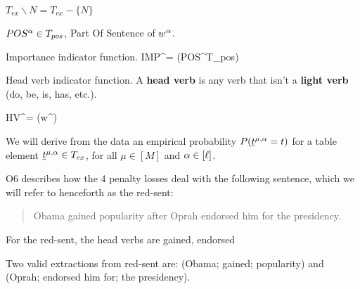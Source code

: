 $T_{ex}\backslash N = T_{ex}-\{N\}$


$POS^\alpha\in T_{pos}$, Part Of Sentence of $w^\alpha$.



Importance indicator function.
\beq
IMP^\alp = \indi(POS^\alp \in T_{pos})
\eeq

Head verb indicator function. A {\bf head verb} is any verb that isn't a {\bf light verb}
(do, be, is, has, etc.).

\beq
HV^\alp = \indi(w^\alp {})
\eeq

We will
derive from the data an empirical probability $P({\underline{t}}^{\mu, \alpha} =t )$ for a table element
${\underline{t}}^{\mu, \alpha}\in T_{ex}$, for all $\mu\in [M]$ and $\alpha\in[\ell]$.

O6 describes how the 4 penalty losses
deal with the following sentence, which we will refer to
henceforth as the red-sent:

\begin{quote}\color{red}
Obama gained popularity after
Oprah endorsed him for the presidency.
\end{quote}

For the red-sent, the head verbs are {\color{red} gained, endorsed}

Two valid extractions from red-sent are:
{\color{red}(Obama; gained; popularity)}
and {\color{red}(Oprah; endorsed him for;
 the presidency)}.


